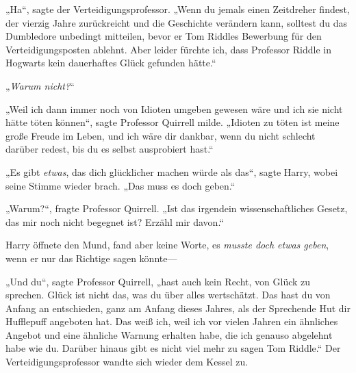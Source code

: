 „Ha“, sagte der Verteidigungsprofessor. „Wenn du jemals einen Zeitdreher findest, der vierzig Jahre zurückreicht und die Geschichte verändern kann, solltest du das Dumbledore unbedingt mitteilen, bevor er Tom Riddles Bewerbung für den Verteidigungsposten ablehnt. Aber leider fürchte ich, dass Professor Riddle in Hogwarts kein dauerhaftes Glück gefunden hätte.“

„\emph{Warum nicht?}“

„Weil ich dann immer noch von Idioten umgeben gewesen wäre und ich sie nicht hätte töten können“, sagte Professor Quirrell milde. „Idioten zu töten ist meine große Freude im Leben, und ich wäre dir dankbar, wenn du nicht schlecht darüber redest, bis du es selbst ausprobiert hast.“

„Es gibt \emph{etwas}, das dich glücklicher machen würde als das“, sagte Harry, wobei seine Stimme wieder brach. „Das muss es doch geben.“

„Warum?“, fragte Professor Quirrell. „Ist das irgendein wissenschaftliches Gesetz, das mir noch nicht begegnet ist? Erzähl mir davon.“

Harry öffnete den Mund, fand aber keine Worte, es \emph{musste doch etwas geben}, wenn er nur das Richtige sagen könnte—

„Und du“, sagte Professor Quirrell, „hast auch kein Recht, von Glück zu sprechen. Glück ist nicht das, was du über alles wertschätzt. Das hast du von Anfang an entschieden, ganz am Anfang dieses Jahres, als der Sprechende Hut dir Hufflepuff angeboten hat. Das weiß ich, weil ich vor vielen Jahren ein ähnliches Angebot und eine ähnliche Warnung erhalten habe, die ich genauso abgelehnt habe wie du. Darüber hinaus gibt es nicht viel mehr zu sagen Tom Riddle.“
Der Verteidigungsprofessor wandte sich wieder dem Kessel zu.

